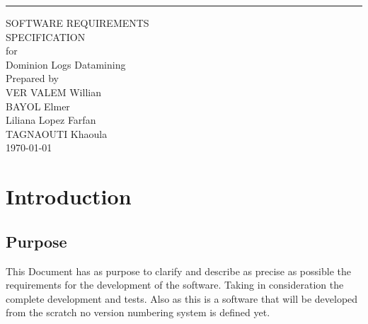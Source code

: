 \documentclass{scrreprt}
\date{}
\begin{document}
\begin{flushright}
    \rule{16cm}{5pt}\vskip1cm
    \begin{bfseries}
        \Huge{SOFTWARE REQUIREMENTS\\ SPECIFICATION}\\
        \vspace{1.9cm}
        for\\
        \vspace{1.9cm}
        Dominion Logs Datamining\\
        \vspace{1.9cm}
        Prepared by \\ VER VALEM Willian \\ BAYOL Elmer \\ Liliana Lopez Farfan
        \\ TAGNAOUTI Khaoula\\
        \vspace{1.9cm}
        \today\\
    \end{bfseries}
\end{flushright}

\tableofcontents




\chapter{Introduction}

\section{Purpose}
This Document has as purpose to clarify and describe as precise as possible the
requirements for the development of the software.
Taking in consideration the complete development and tests.
Also as this is a software that will be developed from the scratch no version
numbering system is defined yet.
\end{document}

